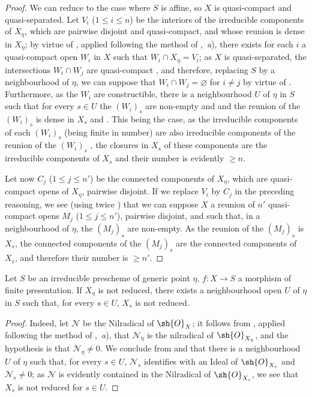 \begin{proof}
We can reduce to the case where $S$ is affine, so $X$ is quasi-compact and quasi-separated.
Let $V_i$ ($1\leqslant i\leqslant n$) be the interiors of the irreducible components of $X_\eta$, which are pairwise disjoint and quasi-compact, and whose reunion is dense in $X_\eta$; by virtue of , applied following the method of ,~\emph{a}), there exists for each $i$ a quasi-compact open $W_i$ in $X$ such that $W_i\cap X_\eta=V_i$; as $X$ is quasi-separated, the intersections $W_i\cap W_j$ are quasi-compact , and therefore, replacing $S$ by a neighbourhood of $\eta$, we can suppose that $W_i\cap W_j=\varnothing$ for $i\neq j$ by virtue of .
Furthermore, as the $W_i$ are constructible, there is a neighbourhood $U$ of $\eta$ in $S$ such that for every $s\in U$ the $(W_i)_s$ are non-empty  and  and the reunion of the $(W_i)_s$ is dense in $X_s$  and .
This being the case, as the irreducible components of each $(W_i)_s$ (being finite in number) are also irreducible components of the reunion of the $(W_i)_s$ , the closures in $X_s$ of these components are the irreducible components of $X_s$  and their number is evidently $\geqslant n$.

Let now $C_j$ ($1\leqslant j\leqslant n'$) be the connected components of $X_\eta$, which are quasi-compact opens of $X_\eta$, pairwise disjoint.
If we replace $V_i$ by $C_j$ in the preceding reasoning, we see (using twice ) that we can suppose $X$ a reunion of $n'$ quasi-compact opens $M_j$ ($1\leqslant j\leqslant n'$), pairwise disjoint, and such that, in a neighbourhood of $\eta$, the $(M_j)_s$ are non-empty.
As the reunion of the $(M_j)_s$ is $X_s$, the connected components of the $(M_j)_s$ are the connected components of $X_s$, and therefore their number is $\geqslant n'$.
\end{proof}

\begin{lemma}[9.7.2]
\label{IV.9.7.2}
Let $S$ be an irreducible prescheme of generic point $\eta$, $f:X\to S$ a morphism of finite presentation.
If $X_\eta$ is not reduced, there exists a neighbourhood open $U$ of $\eta$ in $S$ such that, for every $s\in U$, $X_s$ is not reduced.
\end{lemma}

\begin{proof}
Indeed, let $\mathscr{N}$ be the Nilradical of $\sh{O}_X$; it follows from , applied following the method of ,~\emph{a}), that $\mathscr{N}_\eta$ is the nilradical of $\sh{O}_{X_\eta}$, and the hypothesis is that $\mathscr{N}_\eta\neq 0$.
We conclude from  and  that there is a neighbourhood $U$ of $\eta$ such that, for every $s\in U$, $\mathscr{N}_s$ identifies with an Ideal of $\sh{O}_{X_s}$ and $\mathscr{N}_s\neq 0$; as $\mathscr{N}$ is evidently contained in the Nilradical of $\sh{O}_{X_s}$, we see that $X_s$ is not reduced for $s\in U$.
\end{proof}

